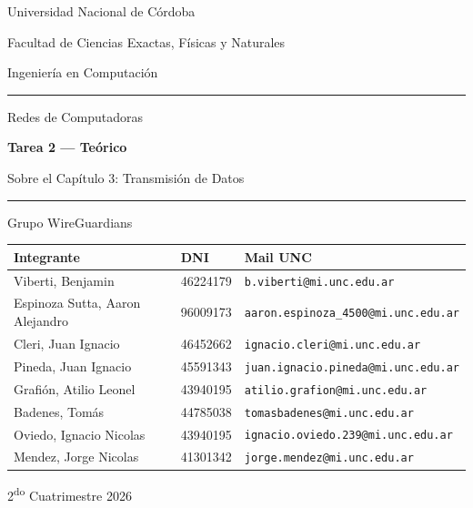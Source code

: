 \documentclass[11pt,a4paper]{article}
\begin{document}
\begin{titlepage}
    \thispagestyle{empty}
    \centering
    \vspace*{1cm}
    {\large Universidad Nacional de Córdoba\par}
    {\large Facultad de Ciencias Exactas, Físicas y Naturales\par}
    {\large Ingeniería en Computación\par}

    \vspace{1cm}
    \rule{\linewidth}{0.4pt}
    \vspace{1.5cm}

    {\Large Redes de Computadoras\par}
    \vspace{0.4cm}
    {\huge\bfseries Tarea 2 --- Teórico\par}
    \vspace{0.4cm}
    {\large Sobre el Capítulo 3: Transmisión de Datos\par}

    \vspace{1.5cm}
    \rule{\linewidth}{0.4pt}
    \vspace{2cm}

    {\Large Grupo WireGuardians\par}
    \vspace{1cm}

    \begin{tabular}{lll}
        \toprule
        \textbf{Integrante} & \textbf{DNI} & \textbf{Mail UNC} \\
        \midrule
        Viberti, Benjamin & 46224179 & \texttt{b.viberti@mi.unc.edu.ar} \\
        Espinoza Sutta, Aaron Alejandro & 96009173 & \texttt{aaron.espinoza\_4500@mi.unc.edu.ar} \\
        Cleri, Juan Ignacio & 46452662 & \texttt{ignacio.cleri@mi.unc.edu.ar} \\
        Pineda, Juan Ignacio & 45591343 & \texttt{juan.ignacio.pineda@mi.unc.edu.ar} \\
        Grafión, Atilio Leonel & 43940195 & \texttt{atilio.grafion@mi.unc.edu.ar} \\
        Badenes, Tomás & 44785038 & \texttt{tomasbadenes@mi.unc.edu.ar} \\
        Oviedo, Ignacio Nicolas & 43940195 & \texttt{ignacio.oviedo.239@mi.unc.edu.ar} \\
        Mendez, Jorge Nicolas & 41301342 & \texttt{jorge.mendez@mi.unc.edu.ar} \\
        \bottomrule
    \end{tabular}

    \vfill
    {\large 2\textsuperscript{do} Cuatrimestre 2026\par}
\end{titlepage}
\end{document}
